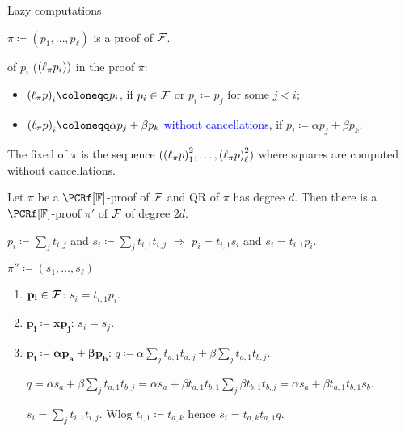 \begin{frame}{Lazy computations \hspace{5pt} }
    
    $\pi \coloneqq (p_1, \dots, p_{\ell})$ is a proof of $\mathcal{F}$.

    \pause
     of $p_i$ (${(\ell_{\pi}{p_i})})$ in the proof $\pi$:
    \begin{itemize}
        \item $\lazy{p}_i \coloneqq p_i$, if $p_i \in \mathcal{F}$ or $p_i \coloneqq p_j$ for some $j < i$;
        \item $\lazy{p}_i \coloneqq \alpha p_j + \beta p_k$ \textcolor{blue}{without cancellations}, if
            $p_i \coloneqq \alpha p_j + \beta p_k$.
    \end{itemize}

    \pause
    The fixed  of $\pi$ is the sequence $({(\ell_{\pi}{p})}_1^2, \dots, {(\ell_{\pi}{p})}_{\ell}^2)$ where
    squares are computed without cancellations.

    \pause
    \begin{lemma}
        Let $\pi$ be a $\PCRf[\field]$-proof of $\mathcal{F}$ and QR of $\pi$ has degree $d$. Then there is a
        $\PCRf[\field]$-proof $\pi'$ of $\mathcal{F}$ of degree $2d$.
    \end{lemma}

    \pause
    $p_i \coloneqq \sum\limits_{j} t_{i, j}$ and $s_i \coloneqq \sum\limits_{j} t_{i, 1} t_{i, j}$
    \hspace{0.4cm} $\Rightarrow$ \hspace{0.4cm} $p_i = t_{i, 1} s_i$ and $s_i = t_{i, 1} p_i$.

    \pause
    $\pi'' \coloneqq (s_1, \dots, s_{\ell})$
    \pause
    
    \begin{enumerate}
        \item $\mathbf{p_i \in \boldsymbol{\mathcal{F}}}$: \hspace{0.3cm} $s_i = t_{i, 1} p_i$.
        \item $\mathbf{p_i \coloneqq x p_j}$: \hspace{0.3cm} $s_i = s_j$.
        \item $\mathbf{p_i \coloneqq \boldsymbol{\alpha} p_a + \boldsymbol{\beta} p_b}$: \hspace{0.3cm}
            \pause $q \coloneqq \alpha \sum\limits_{j} t_{a, 1} t_{a, j} + \beta \sum\limits_{j} t_{a, 1}
            t_{b, j}$.

            \pause
            $q = \alpha s_{a} +  \beta \sum\limits_{j} t_{a, 1} t_{b, j} = \alpha s_a + \beta t_{a, 1}
            t_{b, 1} \sum\limits_{j} \beta t_{b, 1} t_{b, j} = \alpha s_a + \beta t_{a, 1} t_{b, 1} s_b$.

            \pause
            $s_i = \sum\limits_{j} t_{i, 1} t_{i, j}$. Wlog $t_{i, 1} \coloneqq t_{a, k}$ hence $s_i =
            t_{a, k} t_{a, 1} q$.
    \end{enumerate}
\end{frame}
